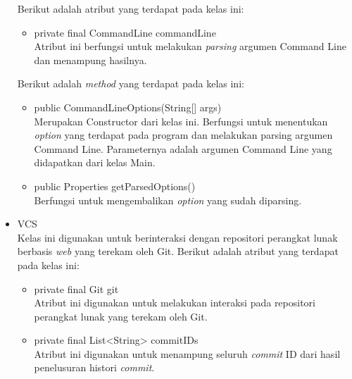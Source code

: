 \begin{itemize}
Berikut adalah atribut yang terdapat pada kelas ini:
\begin{itemize}
    \item private final CommandLine commandLine\\
    Atribut ini berfungsi untuk melakukan \textit{parsing} argumen Command Line dan menampung hasilnya. 
\end{itemize}
Berikut adalah \textit{method} yang terdapat pada kelas ini:
\begin{itemize}
\item public CommandLineOptions(String[] args)\\
Merupakan Constructor dari kelas ini. Berfungsi untuk menentukan \textit{option} yang terdapat pada program dan melakukan parsing argumen Command Line. Parameternya adalah argumen Command Line yang didapatkan dari
kelas Main.
\item public Properties getParsedOptions()\\
Berfungsi untuk mengembalikan \textit{option} yang sudah diparsing.
\end{itemize}

\item VCS\\
Kelas ini digunakan untuk berinteraksi dengan repositori perangkat lunak berbasis \textit{web} yang terekam oleh Git. Berikut adalah atribut yang terdapat pada kelas ini:
\begin{itemize}
   \item  private final Git git\\
   Atribut ini digunakan untuk melakukan interaksi pada repositori perangkat lunak yang terekam oleh Git.
   \item private final List<String> commitIDs\\
   Atribut ini digunakan untuk menampung seluruh \textit{commit} ID dari hasil penelusuran histori \textit{commit}.   
\end{itemize}


\end{itemize}
